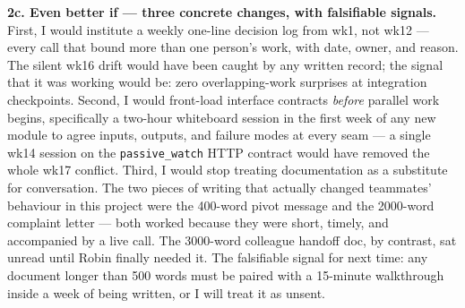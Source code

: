 \textbf{2c. Even better if --- three concrete changes, with falsifiable signals.}
First, I would institute a weekly one-line decision log from wk1, not wk12 --- every call that bound more than one person's work, with date, owner, and reason. The silent wk16 drift would have been caught by any written record; the signal that it was working would be: zero overlapping-work surprises at integration checkpoints. Second, I would front-load interface contracts \emph{before} parallel work begins, specifically a two-hour whiteboard session in the first week of any new module to agree inputs, outputs, and failure modes at every seam --- a single wk14 session on the \texttt{passive\_watch} HTTP contract would have removed the whole wk17 conflict. Third, I would stop treating documentation as a substitute for conversation. The two pieces of writing that actually changed teammates' behaviour in this project were the 400-word pivot message and the 2000-word complaint letter --- both worked because they were short, timely, and accompanied by a live call. The 3000-word colleague handoff doc, by contrast, sat unread until Robin finally needed it. The falsifiable signal for next time: any document longer than 500 words must be paired with a 15-minute walkthrough inside a week of being written, or I will treat it as unsent.
